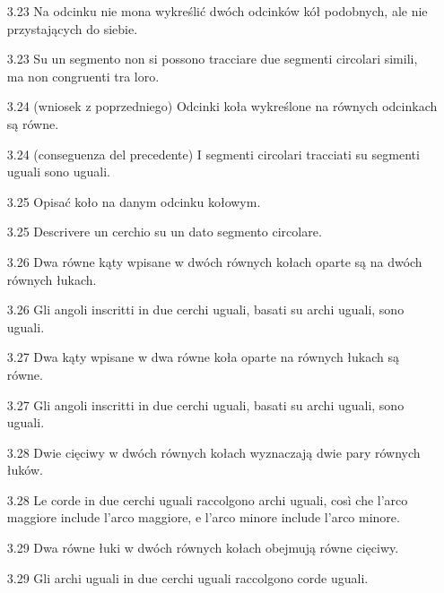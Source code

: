 \begin{enumerate}
    \item [3.23] Na odcinku nie mona wykreślić dwóch odcinków kół podobnych, ale nie przystających do siebie. %
    \item [3.23] Su un segmento non si possono tracciare due segmenti circolari simili, ma non congruenti tra loro. %
    
    \item [3.24] (wniosek z poprzedniego) Odcinki koła wykreślone na równych odcinkach są równe. %
    \item [3.24] (conseguenza del precedente) I segmenti circolari tracciati su segmenti uguali sono uguali. %
    
    \item [3.25] Opisać koło na danym odcinku kołowym. %
    \item [3.25] Descrivere un cerchio su un dato segmento circolare. %
    
    \item [3.26] Dwa równe kąty wpisane w dwóch równych kołach oparte są na dwóch równych łukach. %
    \item [3.26] Gli angoli inscritti in due cerchi uguali, basati su archi uguali, sono uguali. %
    
    \item [3.27] Dwa kąty wpisane w dwa równe koła oparte na równych łukach są równe. %
    \item [3.27] Gli angoli inscritti in due cerchi uguali, basati su archi uguali, sono uguali. %
    
    \item [3.28] Dwie cięciwy w dwóch równych kołach wyznaczają dwie pary równych łuków. %
    \item [3.28] Le corde in due cerchi uguali raccolgono archi uguali, così che l'arco maggiore include l'arco maggiore, e l'arco minore include l'arco minore. %
    
    \item [3.29] Dwa równe łuki w dwóch równych kołach obejmują równe cięciwy. %
    \item [3.29] Gli archi uguali in due cerchi uguali raccolgono corde uguali. %
    

\end{enumerate}
